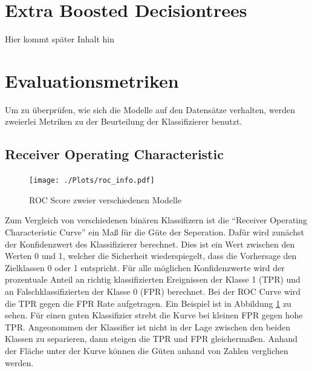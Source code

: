 \section{Extra Boosted Decisiontrees}
Hier kommt später Inhalt hin
\section{Evaluationsmetriken}
Um zu überprüfen, wie sich die Modelle auf den Datensätze verhalten, werden zweierlei Metriken zu der Beurteilung der Klassifizierer benutzt.
\subsection*{Receiver Operating Characteristic}
\begin{figure}
  \centering
  \texttt{[image: ./Plots/roc\_info.pdf]}
  \caption{ROC Score zweier verschiedenen Modelle}
  \label{fig:roc}
\end{figure}
Zum Vergleich von verschiedenen binären Klassifizern ist die ``Receiver Operating Characteristic Curve'' ein Maß für die Güte der Seperation. 
Dafür wird zunächst der Konfidenzwert des Klassifizierer berechnet. 
Dies ist ein Wert zwischen den Werten 0 und 1, welcher die Sicherheit wiederspiegelt, dass die Vorhersage den Zielklassen 0 oder 1 entspricht.
Für alle möglichen Konfidenzwerte wird der prozentuale Anteil an richtig klassifizierten Ereignissen der Klasse 1 (TPR) und an Falschklassifizierten der Klasse 0 (FPR) berechnet. 
Bei der ROC Curve wird die TPR gegen die FPR Rate aufgetragen. 
Ein Beispiel ist in Abbildung \ref{fig:roc} zu sehen.
Für einen guten Klassifizier strebt die Kurve bei kleinen FPR gegen hohe TPR. 
Angeonommen der Klassifier ist nicht in der Lage zwischen den beiden Klassen zu separieren, dann steigen die TPR und FPR gleichermaßen. 
Anhand der Fläche unter der Kurve können die Güten anhand von Zahlen verglichen werden.
